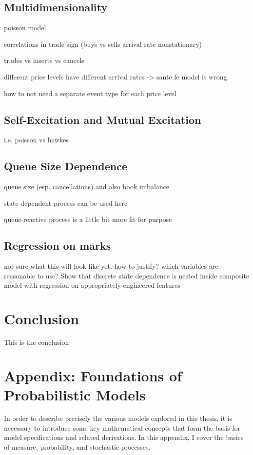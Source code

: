 \documentclass[honours,12pt]{unswthesis}
\numberwithin{equation}{section}
\begin{document}
\section{Multidimensionality}
poisson model

correlations in trade sign (buys vs sells arrival rate nonstationary)

trades vs inserts vs cancels

different price levels have different arrival rates -> sante fe model is wrong

how to not need a separate event type for each price level

\section{Self-Excitation and Mutual Excitation}
i.e. poisson vs hawkes

\section{Queue Size Dependence}
queue size (esp. cancellations) and also book imbalance

state-dependent process can be used here

queue-reactive process is a little bit more fit for purpose

\section{Regression on marks}
not sure what this will look like yet. how to justify? which variables are reasonable to use?
Show that discrete state dependence is nested inside composite model with regression on appropriately engineered features


\chapter{Conclusion}\label{ccl}


This is the conclusion


\chapter{Appendix: Foundations of Probabilistic Models}
In order to describe precisely the various models explored in this thesis, it is necessary to introduce some key mathematical concepts that form the basis for model specifications and related derivations. In this appendix, I cover the basics of measure, probability, and stochastic processes.
\end{document}
